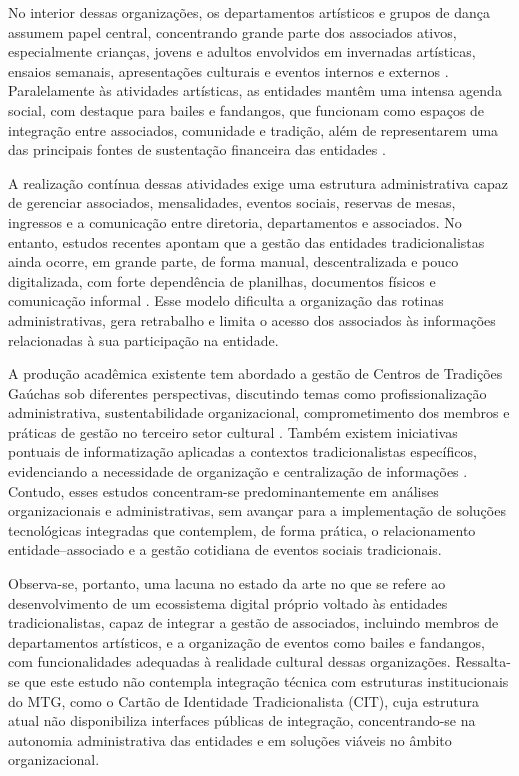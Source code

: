 ﻿\documentclass[12pt,a4paper]{article}
\begin{document}
No interior dessas organizações, os departamentos artísticos e grupos de dança assumem papel central, concentrando grande parte dos associados ativos, especialmente crianças, jovens e adultos envolvidos em invernadas artísticas, ensaios semanais, apresentações culturais e eventos internos e externos \citep{uliana2019,fabricio2019}. Paralelamente às atividades artísticas, as entidades mantêm uma intensa agenda social, com destaque para bailes e fandangos, que funcionam como espaços de integração entre associados, comunidade e tradição, além de representarem uma das principais fontes de sustentação financeira das entidades \citep{silvaalbarello2024}.

A realização contínua dessas atividades exige uma estrutura administrativa capaz de gerenciar associados, mensalidades, eventos sociais, reservas de mesas, ingressos e a comunicação entre diretoria, departamentos e associados. No entanto, estudos recentes apontam que a gestão das entidades tradicionalistas ainda ocorre, em grande parte, de forma manual, descentralizada e pouco digitalizada, com forte dependência de planilhas, documentos físicos e comunicação informal \citep{jardim2022,silvaalbarello2024}. Esse modelo dificulta a organização das rotinas administrativas, gera retrabalho e limita o acesso dos associados às informações relacionadas à sua participação na entidade.

A produção acadêmica existente tem abordado a gestão de Centros de Tradições Gaúchas sob diferentes perspectivas, discutindo temas como profissionalização administrativa, sustentabilidade organizacional, comprometimento dos membros e práticas de gestão no terceiro setor cultural \citep{uliana2019,martini2019,fabricio2019,silvaalbarello2024}. Também existem iniciativas pontuais de informatização aplicadas a contextos tradicionalistas específicos, evidenciando a necessidade de organização e centralização de informações \citep{jardim2022}. Contudo, esses estudos concentram-se predominantemente em análises organizacionais e administrativas, sem avançar para a implementação de soluções tecnológicas integradas que contemplem, de forma prática, o relacionamento entidade--associado e a gestão cotidiana de eventos sociais tradicionais.

Observa-se, portanto, uma lacuna no estado da arte no que se refere ao desenvolvimento de um ecossistema digital próprio voltado às entidades tradicionalistas, capaz de integrar a gestão de associados, incluindo membros de departamentos artísticos, e a organização de eventos como bailes e fandangos, com funcionalidades adequadas à realidade cultural dessas organizações. Ressalta-se que este estudo não contempla integração técnica com estruturas institucionais do MTG, como o Cartão de Identidade Tradicionalista (CIT), cuja estrutura atual não disponibiliza interfaces públicas de integração, concentrando-se na autonomia administrativa das entidades e em soluções viáveis no âmbito organizacional.
\end{document}
